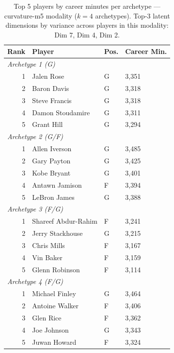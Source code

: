 \begin{table}[htbp]
  \centering\small
  \begin{tabular}{rlll}
    \toprule
    Rank & Player & Pos. & Career Min. \\
    \midrule
    \multicolumn{4}{l}{\textit{Archetype 1 (G)}} \\
    \midrule
    1 & Jalen Rose & G & 3,351 \\
    2 & Baron Davis & G & 3,318 \\
    3 & Steve Francis & G & 3,318 \\
    4 & Damon Stoudamire & G & 3,311 \\
    5 & Grant Hill & G & 3,294 \\
    \midrule[0.4pt]
    \multicolumn{4}{l}{\textit{Archetype 2 (G/F)}} \\
    \midrule
    1 & Allen Iverson & G & 3,485 \\
    2 & Gary Payton & G & 3,425 \\
    3 & Kobe Bryant & G & 3,401 \\
    4 & Antawn Jamison & F & 3,394 \\
    5 & LeBron James & G & 3,388 \\
    \midrule[0.4pt]
    \multicolumn{4}{l}{\textit{Archetype 3 (F/G)}} \\
    \midrule
    1 & Shareef Abdur-Rahim & F & 3,241 \\
    2 & Jerry Stackhouse & G & 3,215 \\
    3 & Chris Mills & F & 3,167 \\
    4 & Vin Baker & F & 3,159 \\
    5 & Glenn Robinson & F & 3,114 \\
    \midrule[0.4pt]
    \multicolumn{4}{l}{\textit{Archetype 4 (F/G)}} \\
    \midrule
    1 & Michael Finley & G & 3,464 \\
    2 & Antoine Walker & F & 3,406 \\
    3 & Glen Rice & F & 3,362 \\
    4 & Joe Johnson & G & 3,343 \\
    5 & Juwan Howard & F & 3,324 \\
    \bottomrule
  \end{tabular}
  \caption{Top 5 players by career minutes per archetype --- curvature-m5 modality ($k=4$ archetypes). Top-3 latent dimensions by variance across players in this modality: Dim 7, Dim 4, Dim 2.}
  \label{tab:arch_reps_curvature_m5}
\end{table}

